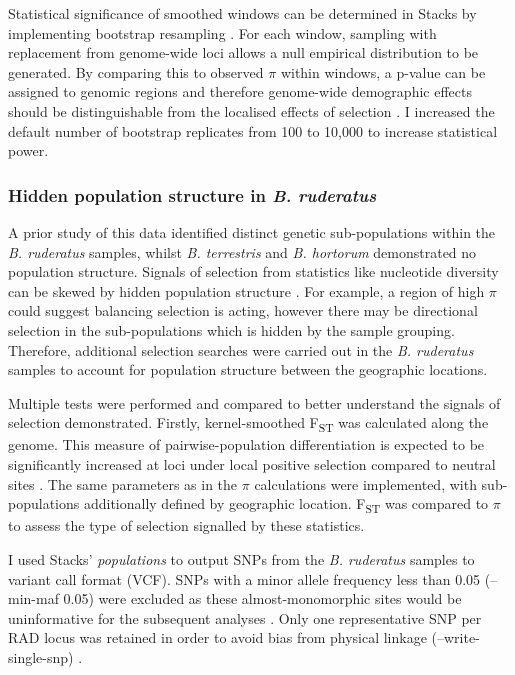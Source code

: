 \documentclass[12pt]{article}
\begin{document}
\begin{linenumbers}
		Statistical significance of smoothed windows can be determined in Stacks by implementing bootstrap resampling \citep{hohenlohe_population_2010, catchen_stacks_2013}. For each window, sampling with replacement from genome-wide loci allows a null empirical distribution to be generated. By comparing this to observed $\pi$ within windows, a p-value can be assigned to genomic regions and therefore genome-wide demographic effects should be distinguishable from the localised effects of selection \citep{hohenlohe_population_2012, ahrens_search_2018}. I increased the default number of bootstrap replicates from 100 to 10,000 to increase statistical power. 
		
		\subsubsection{Hidden population structure in \emph{B. ruderatus}}
		
		A prior study of this data identified distinct genetic sub-populations within the \emph{B. ruderatus} samples, whilst \emph{B. terrestris} and \emph{B. hortorum} demonstrated no population structure.
		Signals of selection from statistics like nucleotide diversity can be skewed by hidden population structure \citep{hohenlohe_using_2010}. For example, a region of high $\pi$ could suggest balancing selection is acting, however there may be directional selection in the sub-populations which is hidden by the sample grouping. Therefore, additional selection searches were carried out in the \emph{B. ruderatus} samples to account for population structure between the geographic locations. 
		
		Multiple tests were performed and compared to better understand the signals of selection demonstrated. Firstly, kernel-smoothed F\textsubscript{ST} was calculated along the genome. This measure of pairwise-population differentiation is expected to be significantly increased at loci under local positive selection compared to neutral sites \citep{weigand_detecting_2018}. The same parameters as in the $\pi$ calculations were implemented, with sub-populations additionally defined by geographic location. 
		F\textsubscript{ST} was compared to $\pi$ to assess the type of selection signalled by these statistics.
		
		I used Stacks' \emph{populations} to output SNPs from the \emph{B. ruderatus} samples to variant call format (VCF). SNPs with a minor allele frequency less than 0.05 (--min-maf 0.05) were excluded as these almost-monomorphic sites would be uninformative for the subsequent analyses \citep{foll_genome-scan_2008, whitlock_reliable_2015}. Only one representative SNP per RAD locus was retained in order to avoid bias from physical linkage (--write-single-snp) \citep{drinan_population_2018, leiva_population_2019}.
		

\end{linenumbers}
\end{document}
